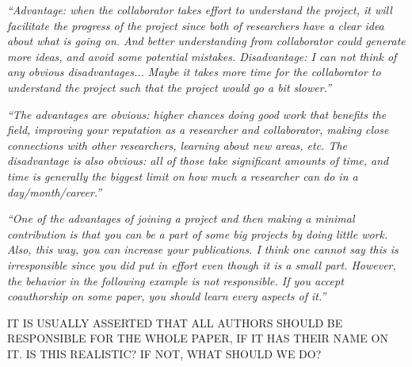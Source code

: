\documentclass[portrait,11pt]{seminar}
\begin{document}
\es {}

{\it ``Advantage: when the collaborator takes effort to understand the project, it will facilitate the progress of the project since both of researchers have a clear idea about what is going on. And better understanding from collaborator could generate more ideas, and avoid some potential mistakes.  Disadvantage: I can not think of any obvious disadvantages... Maybe it takes more time for the collaborator to understand the project such that the project would go a bit slower.''}

\es
\bs

{\it ``The advantages are obvious: higher chances doing good work that benefits the field, improving your reputation as a researcher and collaborator, making close connections with other researchers, learning about new areas, etc. The disadvantage is also obvious: all of those take significant amounts of time, and time is generally the biggest limit on how much a researcher can do in a day/month/career.''}

\es
\bs

{\it ``One of the advantages of joining a project and then making a minimal contribution is that you can be a part of some big projects by doing little work. Also, this way, you can increase your publications. I think one cannot say this is irresponsible since you did put in effort even though it is a small part. However, the behavior in the following example is not responsible. If you accept coauthorship on some paper, you should learn every aspects of it.''}

    IT IS USUALLY ASSERTED THAT ALL  AUTHORS SHOULD BE RESPONSIBLE FOR THE WHOLE PAPER, IF IT HAS THEIR NAME ON IT. IS THIS REALISTIC? IF NOT, WHAT SHOULD WE DO?

\es
\bs



\end{document}
